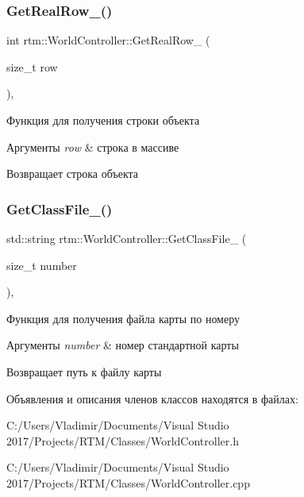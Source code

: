 \subsubsection{\texorpdfstring{Get\+Real\+Row\+\_\+()}{GetRealRow\_()}}
{\footnotesize\ttfamily int rtm\+::\+World\+Controller\+::\+Get\+Real\+Row\+\_\+ (\begin{DoxyParamCaption}\item[{size\+\_\+t}]{row }\end{DoxyParamCaption})\hspace{0.3cm}{\ttfamily [inline]}, {\ttfamily [private]}}

Функция для получения строки объекта 
\begin{DoxyParams}{Аргументы}
{\em row} & строка в массиве \\
\hline
\end{DoxyParams}
\begin{DoxyReturn}{Возвращает}
строка объекта 
\end{DoxyReturn}
\mbox{\label{classrtm_1_1_world_controller_a0f1868e663f83dcd5e31a056cfafb0f5}} 
\subsubsection{\texorpdfstring{Get\+Class\+File\+\_\+()}{GetClassFile\_()}}
{\footnotesize\ttfamily std\+::string rtm\+::\+World\+Controller\+::\+Get\+Class\+File\+\_\+ (\begin{DoxyParamCaption}\item[{size\+\_\+t}]{number }\end{DoxyParamCaption})\hspace{0.3cm}{\ttfamily [static]}, {\ttfamily [private]}}

Функция для получения файла карты по номеру 
\begin{DoxyParams}{Аргументы}
{\em number} & номер стандартной карты \\
\hline
\end{DoxyParams}
\begin{DoxyReturn}{Возвращает}
путь к файлу карты 
\end{DoxyReturn}


Объявления и описания членов классов находятся в файлах\+:\begin{DoxyCompactItemize}
\item 
C\+:/\+Users/\+Vladimir/\+Documents/\+Visual Studio 2017/\+Projects/\+R\+T\+M/\+Classes/World\+Controller.\+h\item 
C\+:/\+Users/\+Vladimir/\+Documents/\+Visual Studio 2017/\+Projects/\+R\+T\+M/\+Classes/World\+Controller.\+cpp\end{DoxyCompactItemize}
